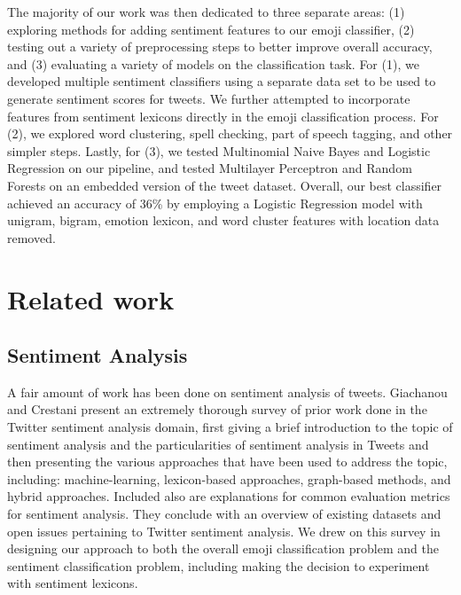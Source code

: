 \documentclass[11pt]{article}
\begin{document}
The majority of our work was then dedicated to three separate areas: (1) exploring methods for adding sentiment features to our emoji classifier, (2) testing out a variety of preprocessing steps to better improve overall accuracy, and (3) evaluating a variety of models on the classification task. For (1), we developed multiple sentiment classifiers using a separate data set to be used to generate sentiment scores for tweets. We further attempted to incorporate features from sentiment lexicons directly in the emoji classification process. For (2), we explored word clustering, spell checking, part of speech tagging, and other simpler steps. Lastly, for (3), we tested Multinomial Naive Bayes and Logistic Regression on our pipeline, and tested Multilayer Perceptron and Random Forests on an embedded version of the tweet dataset. Overall, our best classifier achieved an accuracy of 36\% by employing a Logistic Regression model with unigram, bigram, emotion lexicon, and word cluster features with location data removed.

\section{Related work}

\subsection{Sentiment Analysis}

A fair amount of work has been done on sentiment analysis of tweets. Giachanou and Crestani \cite{giachanou2016like} present an extremely thorough survey of prior work done in the Twitter sentiment analysis domain, first giving a brief introduction to the topic of sentiment analysis and the particularities of sentiment analysis in Tweets and then presenting the various approaches that have been used to address the topic, including: machine-learning, lexicon-based approaches, graph-based methods, and hybrid approaches. Included also are explanations for common evaluation metrics for sentiment analysis. They conclude with an overview of existing datasets and open issues pertaining to Twitter sentiment analysis. We drew on this survey in designing our approach to both the overall emoji classification problem and the sentiment classification problem, including making the decision to experiment with sentiment lexicons.
\end{document}
